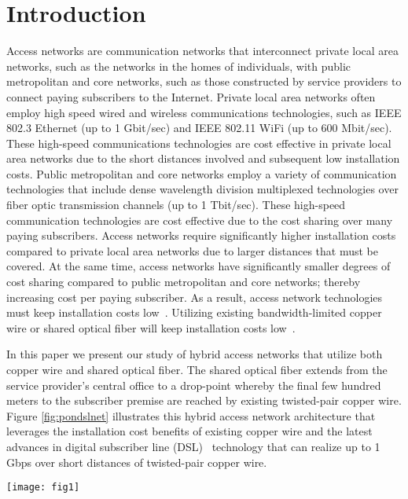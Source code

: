 \documentclass[pdftex,journal]{IEEEtran}
\begin{document}
\section{Introduction}
\label{sec:intro}
Access networks are communication networks that interconnect private local
area networks, such as the networks in the homes of individuals, with public
metropolitan and core networks, such as those constructed by service providers
to connect paying subscribers to the Internet.
Private local area networks often employ high speed wired and wireless
communications technologies, such as IEEE 802.3 Ethernet (up to 1 Gbit/sec)
and IEEE 802.11 WiFi (up to 600 Mbit/sec). These high-speed communications
technologies are cost effective in private local area networks due to
the short distances involved and subsequent low installation costs.
Public metropolitan and core networks employ a variety of communication
technologies that include dense wavelength division multiplexed technologies
over fiber optic transmission channels (up to 1 Tbit/sec). These high-speed
communication technologies are cost effective due to the
cost sharing over many paying subscribers. Access networks require
significantly higher installation costs compared to private local area
networks due to larger distances that must be covered. At the same time,
access networks have significantly smaller degrees of cost sharing compared
to public metropolitan and core networks; thereby increasing cost per paying
subscriber. As a result, access network technologies must keep installation
costs low~\cite{K0506}. Utilizing existing bandwidth-limited copper wire or
shared optical fiber will keep installation costs low~\cite{maz2014coe}.

In this paper we present our study of hybrid access networks that utilize
both copper wire and shared optical fiber. The shared optical fiber extends
from the service provider's central office to a drop-point whereby the final
few hundred meters to the subscriber premise are reached by existing
twisted-pair
copper wire. Figure \ref{fig:pondslnet} illustrates this hybrid access network
architecture that leverages the installation cost benefits of existing copper
wire and the latest advances in digital subscriber line (DSL)~\cite{dslbook}
technology that can realize up to 1 Gbps over short distances of twisted-pair
copper wire.
\begin{figure*}[t]
\centering
\texttt{[image: fig1]}
\caption{A hybrid PON/xDSL access network architecture consists of a
  passive optical network (PON) connected to multiple copper digital
  subscriber lines (DSLs). The PON OLT
  connects to several drop-point devices. Each drop-point device is a
  combined PON Optical Network Unit (ONU) and DSL Access Multiplexer
  (DSLAM). Through the DSLAM, each drop-point device connects to
  multiple subscriber DSL customer premise equipment (CPE) nodes.}
\label{fig:pondslnet}
\end{figure*}
\end{document}
